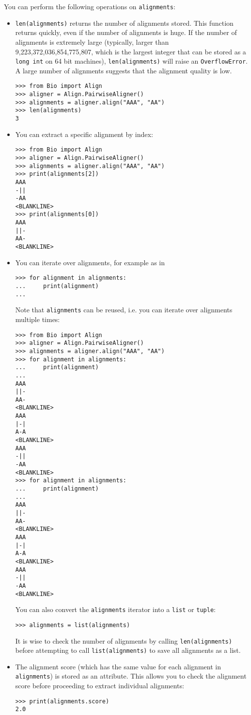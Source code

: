 You can perform the following operations on \verb+alignments+:
\begin{itemize}
\item \verb+len(alignments)+ returns the number of alignments stored. This function returns quickly, even if the number of alignments is huge. If the number of alignments is extremely large (typically, larger than 9,223,372,036,854,775,807, which is the largest integer that can be stored as a \verb+long int+ on 64 bit machines), \verb+len(alignments)+ will raise an \verb+OverflowError+. A large number of alignments suggests that the alignment quality is low.

\begin{verbatim}
>>> from Bio import Align
>>> aligner = Align.PairwiseAligner()
>>> alignments = aligner.align("AAA", "AA")
>>> len(alignments)
3
\end{verbatim}
\item You can extract a specific alignment by index:

\begin{verbatim}
>>> from Bio import Align
>>> aligner = Align.PairwiseAligner()
>>> alignments = aligner.align("AAA", "AA")
>>> print(alignments[2])
AAA
-||
-AA
<BLANKLINE>
>>> print(alignments[0])
AAA
||-
AA-
<BLANKLINE>
\end{verbatim}
\item You can iterate over alignments, for example as in
\begin{verbatim}
>>> for alignment in alignments:
...     print(alignment)
...
\end{verbatim}
Note that \verb+alignments+ can be reused, i.e. you can iterate over alignments multiple times:

\begin{verbatim}
>>> from Bio import Align
>>> aligner = Align.PairwiseAligner()
>>> alignments = aligner.align("AAA", "AA")
>>> for alignment in alignments:
...     print(alignment)
...
AAA
||-
AA-
<BLANKLINE>
AAA
|-|
A-A
<BLANKLINE>
AAA
-||
-AA
<BLANKLINE>
>>> for alignment in alignments:
...     print(alignment)
...
AAA
||-
AA-
<BLANKLINE>
AAA
|-|
A-A
<BLANKLINE>
AAA
-||
-AA
<BLANKLINE>
\end{verbatim}
You can also convert the \verb+alignments+ iterator into a \verb+list+ or \verb+tuple+:
\begin{verbatim}
>>> alignments = list(alignments)
\end{verbatim}
It is wise to check the number of alignments by calling \verb+len(alignments)+ before attempting to call \verb+list(alignments)+ to save all alignments as a list.
\item The alignment score (which has the same value for each alignment in \verb+alignments+) is stored as an attribute. This allows you to check the alignment score before proceeding to extract individual alignments:

\begin{verbatim}
>>> print(alignments.score)
2.0
\end{verbatim}
\end{itemize}

